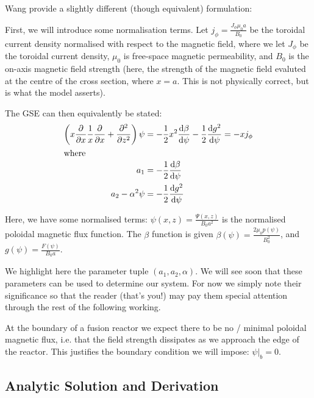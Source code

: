 Wang provide a slightly different (though equivalent) formulation:
\begin{proposition}
    First, we will introduce some normalisation terms. Let $j_\phi = \frac{J_{\phi} \mu_0 a}{B_0}$ be 
    the toroidal current density normalised with respect to the magnetic field, where we let $J_{\phi}$ 
    be the toroidal current density, $\mu_0$ is free-space magnetic permeability, 
    and $B_0$ is the on-axis magnetic field strength (here, the strength of the 
    magnetic field evaluted at the centre of the cross section, where $x = a$. This is not physically correct, 
    but is what the model asserts).

    The GSE can then equivalently be stated:
    \begin{align}
        \left ( x \pdv{x} \frac{1}{x} \pdv{x} + \pdv[2]{z} \right ) \psi &= -\frac{1}{2} x^2 \dv{\beta}{\psi} - \frac{1}{2}\dv{g^2}{\psi} = -x j_{\phi} \\
        \intertext{where}
        a_1 &= -\frac{1}{2} \dv{\beta}{\psi} \\
        a_2 - \alpha^2 \psi &= -\frac{1}{2} \dv{g^2}{\psi}
    \end{align}

    Here, we have some normalised terms: $\psi(x,z) = \frac{\Psi(x,z)}{B_0 a^2}$ is the normalised poloidal magnetic flux function. The $\beta$ 
    function is given $\beta(\psi) = \frac{2 \mu_0 p(\psi)}{B_0^2}$, and $g(\psi) = \frac{F(\psi)}{B_0 a}$. 
\end{proposition} 

\begin{remark}
    We highlight here the parameter tuple $(a_1, a_2, \alpha)$. We will see soon that 
    these parameters can be used to determine our system. For now we simply note their 
    significance so that the reader (that's you!) may pay them special attention through the rest of the following working.
\end{remark}

At the boundary of a fusion reactor we expect there to be no / minimal poloidal magnetic 
flux, i.e. that the field strength dissipates as we approach the edge of the reactor. This justifies 
the boundary condition we will impose: $\psi |_b = 0$. 


\subsection{Analytic Solution and Derivation}

